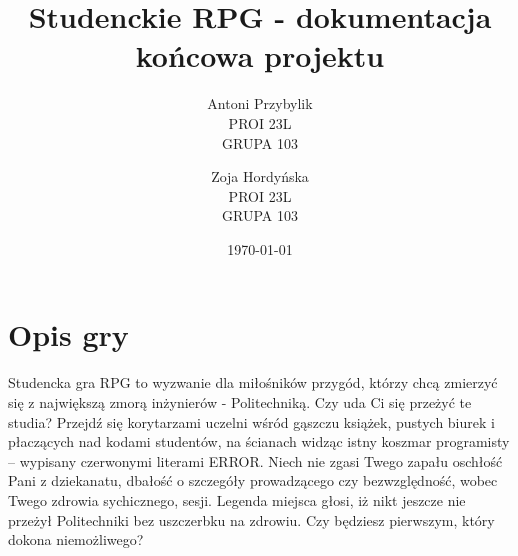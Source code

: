 \documentclass[12pt, titlepage]{article}
\author{Antoni Przybylik \\ PROI 23L \\ GRUPA 103 \and
	Zoja Hordyńska \\ PROI 23L \\ GRUPA 103}
\date{\today}
\title{Studenckie RPG - dokumentacja końcowa projektu}
\begin{document}
\maketitle
\justifying



\hypersetup{
	colorlinks=true,
	linkcolor=blue,
}

\lstset{style=listingstyle}

\section{Opis gry}
Studencka gra RPG to wyzwanie dla
miłośników przygód, którzy chcą zmierzyć
się z największą zmorą inżynierów - Politechniką.
Czy uda Ci się przeżyć te studia?
Przejdź się korytarzami uczelni wśród
gąszczu książek, pustych biurek i
płaczących nad kodami studentów, na ścianach
widząc istny koszmar programisty – wypisany
czerwonymi literami ERROR. Niech nie zgasi
Twego zapału oschłość Pani z dziekanatu,
dbałość o szczegóły prowadzącego czy
bezwzględność, wobec Twego zdrowia
sychicznego, sesji. Legenda miejsca
głosi, iż nikt jeszcze nie przeżył
Politechniki bez uszczerbku na zdrowiu.
Czy będziesz pierwszym, który dokona
niemożliwego? 
\end{document}
